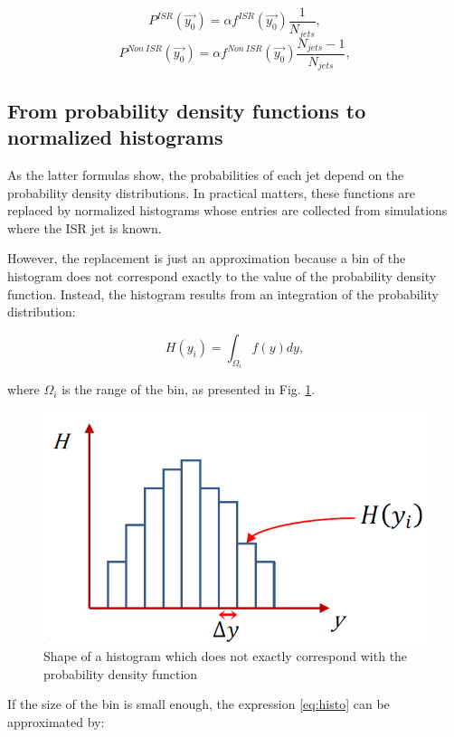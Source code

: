 \documentclass[12pt, oneside]{book}              %
\begin{document}
\begin{equation} \label{eq:Prob_ISR_vec}
P^{ISR}(\vec{y_0}) = \alpha f^{ISR}(\vec{y_0}) \frac{1}{N_{jets}},
\end{equation}
\begin{equation} \label{eq:Prob_Non_ISR_vec}
P^{Non\ ISR}(\vec{y_0}) = \alpha f^{Non\ ISR}(\vec{y_0}) \frac{N_{jets}-1}{N_{jets}},
\end{equation}

\subsection{From probability density functions to normalized histograms} \label{sec:Histos}

As the latter formulas show, the probabilities of each jet depend on the probability density 
distributions. In practical matters, these functions are replaced by normalized histograms whose 
entries are collected from simulations where the ISR jet is known. 

However, the replacement is just an approximation because a bin of the histogram does not correspond
exactly to the value of the probability density function. Instead, the histogram results from an
integration of the probability distribution:

\begin{equation} \label{eq:histo}
H(y_i) = \int_{\Omega_i} f(y)dy,
\end{equation}

\noindent where $ \Omega_i $ is the range of the bin, as presented in Fig. \ref{fig:Histo_shape}.

\begin{figure}[h]
	\centering
	\includegraphics[width=0.5\linewidth]{./Imags_Doc/Histo_shape}
	\caption[Shape of a histogram]{Shape of a histogram which does not exactly correspond with the
		probability density function}
	\label{fig:Histo_shape}
\end{figure}

If the size of the bin is small enough, the expression \ref{eq:histo} can be approximated by:
\end{document}
